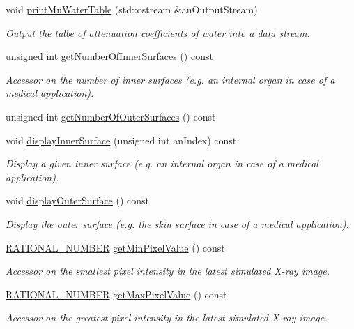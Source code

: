 \begin{DoxyCompactItemize}
void \hyperlink{classg_virtual_x_ray_1_1_x_ray_renderer_a850046acb9a509e18766fd14ee07e035}{printMuWaterTable} (std::ostream \&anOutputStream)
\begin{DoxyCompactList}\small\item\em Output the talbe of attenuation coefficients of water into a data stream. \end{DoxyCompactList}\item 
unsigned int \hyperlink{classg_virtual_x_ray_1_1_x_ray_renderer_a490556bca3d3b345081dd6c4b51a73c0}{getNumberOfInnerSurfaces} () const 
\begin{DoxyCompactList}\small\item\em Accessor on the number of inner surfaces (e.g. an internal organ in case of a medical application). \end{DoxyCompactList}\item 
unsigned int \hyperlink{classg_virtual_x_ray_1_1_x_ray_renderer_a4db9e64934d2753e9b7eff591dc88124}{getNumberOfOuterSurfaces} () const 
\item 
void \hyperlink{classg_virtual_x_ray_1_1_x_ray_renderer_a8c6675449f169cdd75f224b03d9510d0}{displayInnerSurface} (unsigned int anIndex) const 
\begin{DoxyCompactList}\small\item\em Display a given inner surface (e.g. an internal organ in case of a medical application). \end{DoxyCompactList}\item 
void \hyperlink{classg_virtual_x_ray_1_1_x_ray_renderer_a5318d429f1d2d8fda215227228c418bb}{displayOuterSurface} () const 
\begin{DoxyCompactList}\small\item\em Display the outer surface (e.g. the skin surface in case of a medical application). \end{DoxyCompactList}\item 
\hyperlink{namespace_utilities_a40969b96bd8d847b962e297cb79f08ce}{RATIONAL\_\-NUMBER} \hyperlink{classg_virtual_x_ray_1_1_x_ray_renderer_a303d0c055e4b5841aaf9c96c6822b5e4}{getMinPixelValue} () const 
\begin{DoxyCompactList}\small\item\em Accessor on the smallest pixel intensity in the latest simulated X-\/ray image. \end{DoxyCompactList}\item 
\hyperlink{namespace_utilities_a40969b96bd8d847b962e297cb79f08ce}{RATIONAL\_\-NUMBER} \hyperlink{classg_virtual_x_ray_1_1_x_ray_renderer_aaf76470c76161d0fa6afdd4fd0324d69}{getMaxPixelValue} () const 
\begin{DoxyCompactList}\small\item\em Accessor on the greatest pixel intensity in the latest simulated X-\/ray image. \end{DoxyCompactList}\end{DoxyCompactItemize}
